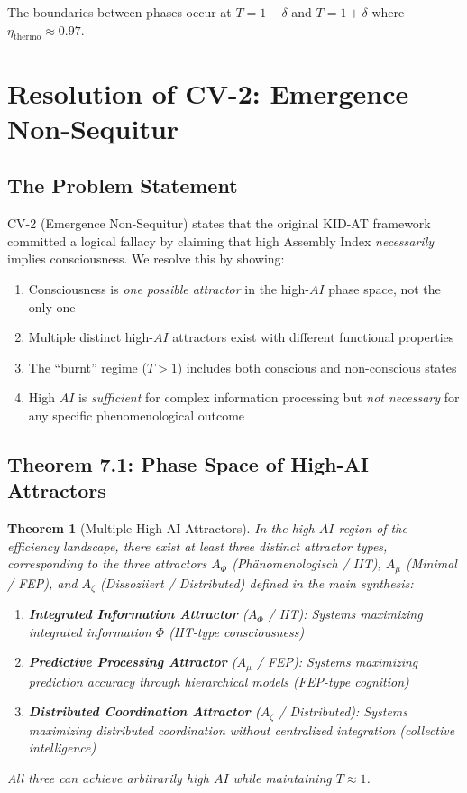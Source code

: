 \documentclass[11pt,a4paper]{article}
\newtheorem{theorem}{Theorem}[section]
\begin{document}
The boundaries between phases occur at $T = 1 - \delta$ and $T = 1 + \delta$ where $\eta_{\text{thermo}} \approx 0.97$.


\section{Resolution of CV-2: Emergence Non-Sequitur}

\subsection{The Problem Statement}

CV-2 (Emergence Non-Sequitur) states that the original KID-AT framework committed a logical fallacy by claiming that high Assembly Index \emph{necessarily} implies consciousness. We resolve this by showing:
\begin{enumerate}[label=(\roman*)]
\item Consciousness is \emph{one possible attractor} in the high-$AI$ phase space, not the only one
\item Multiple distinct high-$AI$ attractors exist with different functional properties
\item The ``burnt'' regime ($T > 1$) includes both conscious and non-conscious states
\item High $AI$ is \emph{sufficient} for complex information processing but \emph{not necessary} for any specific phenomenological outcome
\end{enumerate}

\subsection{Theorem 7.1: Phase Space of High-AI Attractors}

\begin{theorem}[Multiple High-AI Attractors]
In the high-$AI$ region of the efficiency landscape, there exist at least three distinct attractor types, corresponding to the three attractors $A_\Phi$ (Ph\"anomenologisch / IIT), $A_\mu$ (Minimal / FEP), and $A_\zeta$ (Dissoziiert / Distributed) defined in the main synthesis:
\begin{enumerate}[label=\textbf{A\arabic*.}]
\item \textbf{Integrated Information Attractor} ($A_\Phi$ / IIT): Systems maximizing integrated information $\Phi$ (IIT-type consciousness)
\item \textbf{Predictive Processing Attractor} ($A_\mu$ / FEP): Systems maximizing prediction accuracy through hierarchical models (FEP-type cognition)
\item \textbf{Distributed Coordination Attractor} ($A_\zeta$ / Distributed): Systems maximizing distributed coordination without centralized integration (collective intelligence)
\end{enumerate}
All three can achieve arbitrarily high $AI$ while maintaining $T \approx 1$.
\end{theorem}
\end{document}
